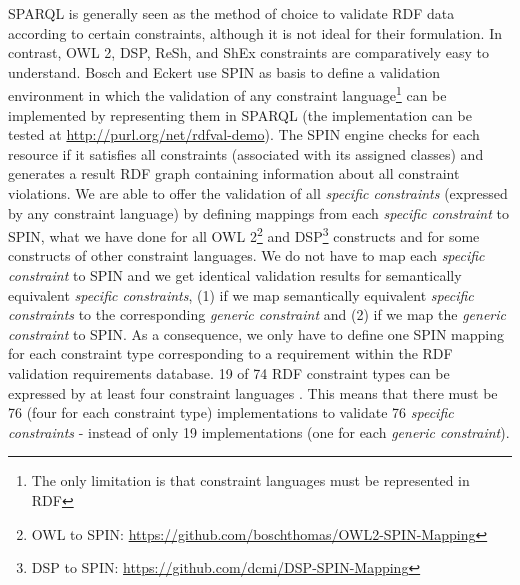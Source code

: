 \documentclass{llncs}
\begin{document}
{SPARQL is generally seen as the method of choice to validate RDF data according to certain constraints, although it is not ideal for their formulation. 
In contrast, OWL 2, DSP, ReSh, and ShEx constraints are comparatively easy to understand. 
Bosch and Eckert \cite{BoschEckert2014-2} use SPIN as basis to define a
validation environment in which the validation of any constraint language\footnote{The only limitation is that constraint languages must be represented in RDF} can be implemented by representing them in SPARQL
(the implementation can be tested at \url{http://purl.org/net/rdfval-demo}).
The SPIN engine checks for each resource if it satisfies all constraints (associated with its assigned classes) and generates a result RDF graph containing information about all constraint violations.
We are able to offer the validation of all \emph{specific constraints} (expressed by any constraint language) by defining mappings from each \emph{specific constraint} to SPIN, 
what we have done for all OWL 2\footnote{OWL to SPIN: \url{https://github.com/boschthomas/OWL2-SPIN-Mapping}} and DSP\footnote{DSP to SPIN: \url{https://github.com/dcmi/DSP-SPIN-Mapping}} constructs and for some constructs of other constraint languages.
We do not have to map each \emph{specific constraint} to SPIN and we get identical validation results for semantically equivalent \emph{specific constraints},
(1) if we map semantically equivalent \emph{specific constraints} to the corresponding \emph{generic constraint} and 
(2) if we map the \emph{generic constraint} to SPIN.
As a consequence, we only have to define one SPIN mapping for each constraint type corresponding to a requirement within the RDF validation requirements database.
19 of 74 RDF constraint types can be expressed by at least four constraint languages \cite{BoschNolleAcarEckert2015}.
This means that there must be 76 (four for each constraint type) implementations to validate 76 \emph{specific constraints} - instead of only 19 implementations (one for each \emph{generic constraint}).


}
\end{document}
